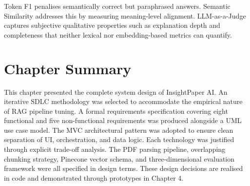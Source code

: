 Token F1 penalises semantically correct but paraphrased answers. Semantic Similarity addresses this by measuring meaning-level alignment. LLM-as-a-Judge captures subjective qualitative properties such as explanation depth and completeness that neither lexical nor embedding-based metrics can quantify.

\section{Chapter Summary}

This chapter presented the complete system design of InsightPaper AI. An iterative SDLC methodology was selected to accommodate the empirical nature of RAG pipeline tuning. A formal requirements specification covering eight functional and five non-functional requirements was produced alongside a UML use case model. The MVC architectural pattern was adopted to ensure clean separation of UI, orchestration, and data logic. Each technology was justified through explicit trade-off analysis. The PDF parsing pipeline, overlapping chunking strategy, Pinecone vector schema, and three-dimensional evaluation framework were all specified in design terms. These design decisions are realised in code and demonstrated through prototypes in Chapter 4.
